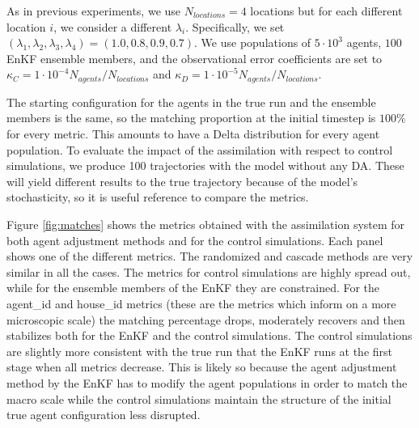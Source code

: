 \documentclass[11pt,a4paper]{article}
\begin{document}
As in previous experiments, we use $N_{locations}=4$ locations but for each different location $i$, we consider a different $\lambda_i$. Specifically, we set $(\lambda_1, \lambda_2, \lambda_3, \lambda_4) = (1.0, 0.8, 0.9, 0.7)$. We use populations of $5\cdot 10^3$ agents, $100$ EnKF ensemble members, and the observational error coefficients are set to $\kappa_{C} = 1 \cdot 10^{-4} N_{agents}/N_{locations}$ and $\kappa_{D} = 1 \cdot 10^{-5} N_{agents}/N_{locations}$. 

The starting configuration for the agents in the true run and the ensemble members is the same, so the matching proportion at the initial timestep is $100\%$ for every metric. This amounts to have a Delta distribution for every agent population. To evaluate the impact of the assimilation with respect to control simulations, we produce 100 trajectories with the model without any DA. These will yield different results to the true trajectory because of the model's stochasticity, so it is useful reference to compare the metrics.

Figure \ref{fig:matches} shows the metrics obtained with the assimilation system for both agent adjustment methods and for the control simulations. Each panel shows one of the different metrics. The randomized and cascade methods are very similar in all the cases. The metrics for control simulations are highly spread out, while  for the ensemble members of the EnKF they are constrained. For the agent\_id and house\_id metrics (these are the metrics which inform on a more microscopic scale) the matching percentage drops, moderately recovers and then stabilizes both for the EnKF and the control simulations. The control simulations are slightly more consistent with the true run that the EnKF runs at the first stage when all metrics decrease. This is likely so because the agent adjustment method by the EnKF has to modify the agent populations in order to match the macro scale while the control simulations maintain the structure of the initial true agent configuration less disrupted.
\end{document}
